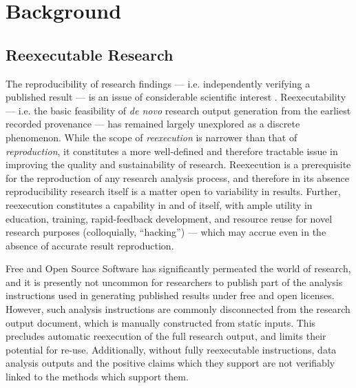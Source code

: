 \section{Background}

\subsection{Reexecutable Research}

The reproducibility of research findings — i.e. independently verifying a published result — is an issue of considerable scientific interest \cite{TODO}.
Reexecutability — i.e. the basic feasibility of \textit{de novo} research output generation from the earliest recorded provenance — has remained largely unexplored as a discrete phenomenon.
While the scope of \textit{reexecution} is narrower than that of \textit{reproduction}, it constitutes a more well-defined and therefore tractable issue in improving the quality and sustainability of research.
Reexecution is a prerequisite for the reproduction of any research analysis process, and therefore in its absence reproducibility research itself is a matter open to variability in results.
Further, reexecution constitutes a capability in and of itself, with ample utility in education, training, rapid-feedback development, and resource reuse for novel research purposes (colloquially, “hacking”) — which may accrue even in the absence of accurate result reproduction.

Free and Open Source Software \cite{foss} has significantly permeated the world of research, and it is presently not uncommon for researchers to publish part of the analysis instructions used in generating published results \cite{TODO} under free and open licenses.
However, such analysis instructions are commonly disconnected from the research output document, which is manually constructed from static inputs.
This precludes automatic reexecution of the full research output, and limits their potential for re-use.
Additionally, without fully reexecutable instructions, data analysis outputs and the positive claims which they support are not verifiably linked to the methods which support them.

